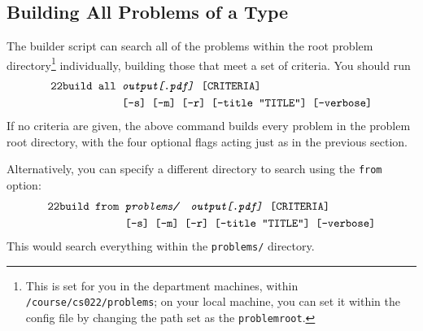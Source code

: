   \subsection{Building All Problems of a Type}
    The builder script can search all of the problems within the root problem 
    directory\footnote{This is set for you in the department machines, within 
    \texttt{/course/cs022/problems}; on your local machine, you can set it 
    within the config file by changing the path set as the 
    \texttt{problemroot}.} 
    individually, building those that meet a set of criteria. You should run
    \begin{align*}
      \texttt{22build }\texttt{all }&\texttt{\textit{output[.pdf]} [CRITERIA]}\\
      ~&\texttt{[-s] [-m] [-r] [--title ``TITLE''] [--verbose]}
    \end{align*}
    If no criteria are given, the above command builds every problem in 
    the problem root directory, with the four optional flags acting just 
    as in the previous section.
    
    Alternatively, you can specify a different directory to search using 
    the \texttt{from} option:
    \begin{align*}
      \pybuild\texttt{from }&\texttt{\textit{problems/\ \ output[.pdf]} [CRITERIA]}\\
      ~&\texttt{[-s] [-m] [-r] [--title ``TITLE''] [--verbose]}
    \end{align*}
    This would search everything within the \texttt{problems/} directory.
    
